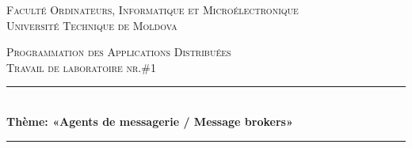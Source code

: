 \begin{titlepage}

  \begin{center} %

  \textsc{\large Faculté Ordinateurs, Informatique et Microélectronique}\\[0.5cm]
  \textsc{\large Université Technique de Moldova}\\[1.2cm] %
  \vspace{25 mm}

  \textsc{\large Programmation des Applications Distribuées}\\[0.5cm] %
  \textsc{\large Travail de laboratoire nr.\#1}\\[0.5cm] %

\newcommand{\HRule}{\rule{\linewidth}{0.5mm}} %

  \vspace{10 mm}
  \HRule \\[0.4cm]
  { \LARGE \bfseries Thème: «Agents de messagerie / Message brokers»}\\[0.4cm] %
  \HRule \\[1.5cm]

      \vspace{30mm}


\end{center}
\end{titlepage}
